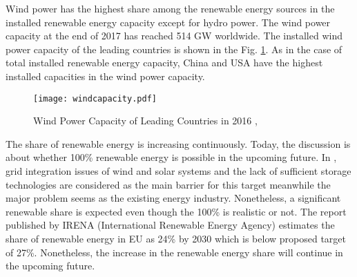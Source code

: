 Wind power has the highest share among the renewable energy sources in the installed renewable energy capacity except for hydro power. The wind power capacity at the end of 2017 has reached 514 GW worldwide\cite{InternationalRenewableEnergyAgencyIRENA2018}. The installed wind power capacity of the leading countries is shown in the Fig. \ref{windcap}. As in the case of total installed renewable energy capacity, China and USA have the highest installed capacities in the wind power capacity. \par
\begin{figure}[h!]
	\centering
	\texttt{[image: windcapacity.pdf]}
	\caption{Wind Power Capacity of Leading Countries in 2016 \cite{InternationalRenewableEnergyAgencyIRENA2018},\cite{InternationalRenewableEnergyAgency2017}}
	\label{windcap}
\end{figure}
The share of renewable energy is increasing continuously. Today, the discussion is about whether 100\% renewable energy is possible in the upcoming future. In \cite{REN212017d}, grid integration issues of wind and solar systems and the lack of sufficient storage technologies are considered as the main barrier for this target meanwhile the major problem seems as the existing energy industry. Nonetheless, a significant renewable share is expected even though the 100\% is realistic or not. The report published by IRENA (International Renewable Energy Agency) estimates the share of renewable energy in EU as 24\% by 2030 which is below proposed target of 27\%\cite{IRENA2014}. Nonetheless, the increase in the renewable energy share will continue in the upcoming future. \par
 
